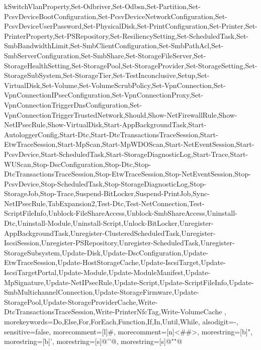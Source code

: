 {{kSwitchVlanProperty,Set-Odbriver,Set-Odbsn,Set-Partition,Set-PcsvDeviceBootConfiguration,Set-PcsvDeviceNetworkConfiguration,Set-PcsvDeviceUserPassword,Set-PhysicalDisk,Set-PrintConfiguration,Set-Printer,Set-PrinterProperty,Set-PSRepository,Set-ResiliencySetting,Set-ScheduledTask,Set-SmbBandwidthLimit,Set-SmbClientConfiguration,Set-SmbPathAcl,Set-SmbServerConfiguration,Set-SmbShare,Set-StorageFileServer,Set-StorageHealthSetting,Set-StoragePool,Set-StorageProvider,Set-StorageSetting,Set-StorageSubSystem,Set-StorageTier,Set-TestInconclusive,Setup,Set-VirtualDisk,Set-Volume,Set-VolumeScrubPolicy,Set-VpnConnection,Set-VpnConnectionIPsecConfiguration,Set-VpnConnectionProxy,Set-VpnConnectionTriggerDnsConfiguration,Set-VpnConnectionTriggerTrustedNetwork,Should,Show-NetFirewallRule,Show-NetIPsecRule,Show-VirtualDisk,Start-AppBackgroundTask,Start-AutologgerConfig,Start-Dtc,Start-DtcTransactionsTraceSession,Start-EtwTraceSession,Start-MpScan,Start-MpWDOScan,Start-NetEventSession,Start-PcsvDevice,Start-ScheduledTask,Start-StorageDiagnosticLog,Start-Trace,Start-WUScan,Stop-DscConfiguration,Stop-Dtc,Stop-DtcTransactionsTraceSession,Stop-EtwTraceSession,Stop-NetEventSession,Stop-PcsvDevice,Stop-ScheduledTask,Stop-StorageDiagnosticLog,Stop-StorageJob,Stop-Trace,Suspend-BitLocker,Suspend-PrintJob,Sync-NetIPsecRule,TabExpansion2,Test-Dtc,Test-NetConnection,Test-ScriptFileInfo,Unblock-FileShareAccess,Unblock-SmbShareAccess,Uninstall-Dtc,Uninstall-Module,Uninstall-Script,Unlock-BitLocker,Unregister-AppBackgroundTask,Unregister-ClusteredScheduledTask,Unregister-IscsiSession,Unregister-PSRepository,Unregister-ScheduledTask,Unregister-StorageSubsystem,Update-Disk,Update-DscConfiguration,Update-EtwTraceSession,Update-HostStorageCache,Update-IscsiTarget,Update-IscsiTargetPortal,Update-Module,Update-ModuleManifest,Update-MpSignature,Update-NetIPsecRule,Update-Script,Update-ScriptFileInfo,Update-SmbMultichannelConnection,Update-StorageFirmware,Update-StoragePool,Update-StorageProviderCache,Write-DtcTransactionsTraceSession,Write-PrinterNfcTag,Write-VolumeCache
	},
	morekeywords={Do,Else,For,ForEach,Function,If,In,Until,While},
	alsodigit={-},
	sensitive=false,
	morecomment=[l]{\#},
	morecomment=[n]{<\#}{\#>},
	morestring=[b]{"},
	morestring=[b]{'},
	morestring=[s]{@'}{'@},
	morestring=[s]{@"}{"@}
}